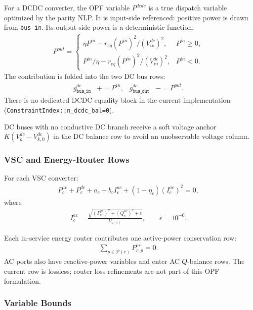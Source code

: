For a DCDC converter, the OPF variable \(P^{dcdc}\) is a true dispatch variable
optimized by the parity NLP.  It is input-side referenced: positive power is
drawn from \texttt{bus\_in}.  Its output-side power is a deterministic function,
\begin{align}
P^{out}=
\begin{cases}
\eta P^{in}-r_{eq}(P^{in})^2/(V_{in}^{dc})^2, & P^{in}\ge 0,\\
P^{in}/\eta-r_{eq}(P^{in})^2/(V_{in}^{dc})^2, & P^{in}<0.
\end{cases}
\end{align}
The contribution is folded into the two DC bus rows:
\begin{align}
g_{\texttt{bus\_in}}^{dc}&\mathrel{+}=P^{in},&
g_{\texttt{bus\_out}}^{dc}&\mathrel{-}=P^{out}.
\end{align}
There is no dedicated DCDC equality block in the current implementation
(\texttt{ConstraintIndex::n\_dcdc\_bal=0}).

DC buses with no conductive DC branch receive a soft voltage anchor
\(K(V_k^{dc}-V_{k,0}^{dc})\) in the DC balance row to avoid an unobservable
voltage column.

\subsubsection{VSC and Energy-Router Rows}

For each VSC converter:
\begin{align}
P_c^{ac}+P_c^{dc}+a_c+b_cI_c^{ac}+(1-\eta_c)(I_c^{ac})^2=0,
\end{align}
where
\begin{align}
I_c^{ac}=
\frac{\sqrt{(P_c^{ac})^2+(Q_c^{ac})^2+\epsilon}}{V_{a(c)}},
\qquad \epsilon=10^{-6}.
\end{align}

Each in-service energy router contributes one active-power conservation row:
\begin{align}
\sum_{p\in\mathcal{P}(r)}P_{r,p}^{er}=0.
\end{align}
AC ports also have reactive-power variables and enter AC \(Q\)-balance rows.
The current row is lossless; router loss refinements are not part of this OPF
formulation.

\subsubsection{Variable Bounds}

